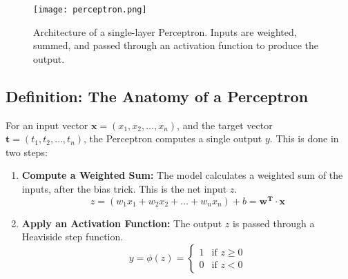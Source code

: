 \begin{figure}
    \centering
    \texttt{[image: perceptron.png]}
    \caption{Architecture of a single-layer Perceptron. Inputs are weighted, summed, and passed through an activation function to produce the output.}
    \label{fig:perceptron_architecture} 
\end{figure}


\subsection{Definition: The Anatomy of a Perceptron}
For an input vector \(\mathbf{x} = (x_1, x_2, \dots, x_n)\), and the target vector \(\mathbf{t} = (t_1, t_2, \dots, t_n)\), the Perceptron computes a single output \(y\). This is done in two steps:
\begin{enumerate}
    \item \textbf{Compute a Weighted Sum:} The model calculates a weighted sum of the inputs, after the bias trick. This is the net input \(z\).
    \[ z = (w_1 x_1 + w_2 x_2 + \dots + w_n x_n) + b = \mathbf{w^{T}} \cdot \mathbf{x}\]
    \item \textbf{Apply an Activation Function:} The output \(z\) is passed through a Heaviside step function.
    \[ y = \phi(z) = \begin{cases} 1 & \text{if } z \ge 0 \\ 0 & \text{if } z < 0 \end{cases} \]
\end{enumerate}

